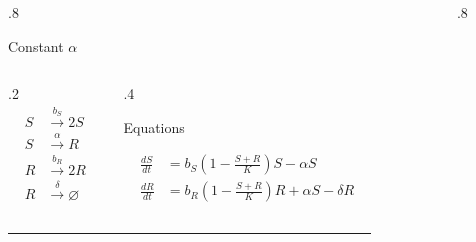 \documentclass[final]{beamer}
\newlength{\sepwid}
\newlength{\onecolwid}
\begin{document}
\begin{frame}[t]
\begin{block}
\begin{columns}[t]
\begin{column}{.8\onecolwid}
\begin{block}{Constant $\alpha$}
\begin{columns}[t]
\begin{column}{.2\onecolwid}
      \begin{align*}
        S & \stackrel{b_S}{\rightarrow} 2S \\
        S & \stackrel{\alpha}{\rightarrow}  R \\
        R & \stackrel{b_R}{\rightarrow} 2R \\
        R & \stackrel{\delta}{\rightarrow} \varnothing
      \end{align*}
    \end{column}
      \vrule
    \begin{column}{.4\onecolwid}
      \begin{center}
        Equations
      \end{center}

      \begin{align*}
        \frac{dS}{dt}& = b_S \left(1 - \frac{S + R}{K}\right)S - \alpha S \\[0.5ex]
        \frac{dR}{dt}& = b_R \left(1 - \frac{S + R}{K}\right)R + \alpha S - \delta R
      \end{align*}

      \vspace{2.9\baselineskip}
      \vspace{1ex}
    \end{column}
  \end{columns}
  \hrule height 3pt
  \end{block}
\end{column}

\vrule width 5pt
\begin{column}{\sepwid}\end{column} %

\begin{column}{.8\onecolwid}


\end{column}
\end{columns}
\end{block}
\end{frame}
\end{document}
